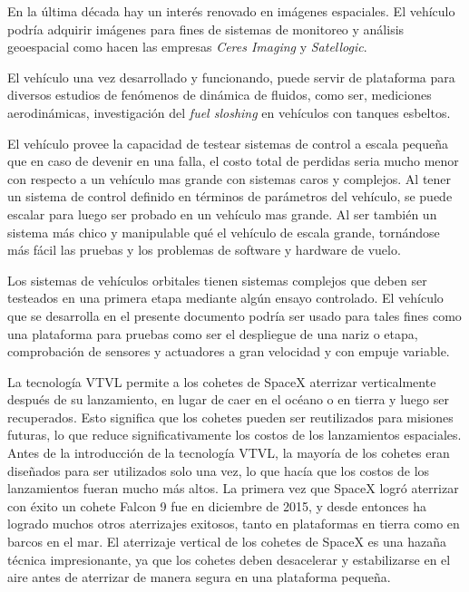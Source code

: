 \medskip

En la última década hay un interés renovado en imágenes espaciales. El vehículo podría adquirir imágenes para fines de sistemas de monitoreo y análisis geoespacial como hacen las empresas \textit{Ceres Imaging} y \textit{Satellogic}. %

\medskip

El vehículo una vez desarrollado y funcionando, puede servir de plataforma para diversos
estudios de fenómenos de dinámica de fluidos, como ser, mediciones aerodinámicas,
investigación del \textit{fuel sloshing} en vehículos con tanques esbeltos.

\medskip

El vehículo provee la capacidad de testear sistemas de control a escala pequeña que en caso de devenir en una falla, el costo total de perdidas seria mucho menor con respecto a un vehículo mas grande con sistemas caros y complejos.  Al tener un sistema de control definido en términos de parámetros del vehículo, se puede escalar para luego ser probado en un vehículo mas grande. Al ser también un sistema más chico y manipulable qué el vehículo de escala grande, tornándose más fácil las pruebas y los problemas de software y hardware de vuelo.

\medskip


Los sistemas de vehículos orbitales tienen sistemas complejos que deben ser testeados en una primera etapa mediante algún ensayo controlado. El vehículo que se desarrolla en el presente documento podría ser usado para tales fines como una plataforma para pruebas como ser el despliegue de una nariz o etapa, comprobación de sensores y actuadores a gran velocidad y con empuje variable.

\medskip

La tecnología VTVL permite a los cohetes de SpaceX aterrizar verticalmente después de su lanzamiento, en lugar de caer en el océano o en tierra y luego ser recuperados. Esto significa que los cohetes pueden ser reutilizados para misiones futuras, lo que reduce significativamente los costos de los lanzamientos espaciales. Antes de la introducción de la tecnología VTVL, la mayoría de los cohetes eran diseñados para ser utilizados solo una vez, lo que hacía que los costos de los lanzamientos fueran mucho más altos.
La primera vez que SpaceX logró aterrizar con éxito un cohete Falcon 9 fue en diciembre de 2015, y desde entonces ha logrado muchos otros aterrizajes exitosos, tanto en plataformas en tierra como en barcos en el mar. El aterrizaje vertical de los cohetes de SpaceX es una hazaña técnica impresionante, ya que los cohetes deben desacelerar y estabilizarse en el aire antes de aterrizar de manera segura en una plataforma pequeña.


